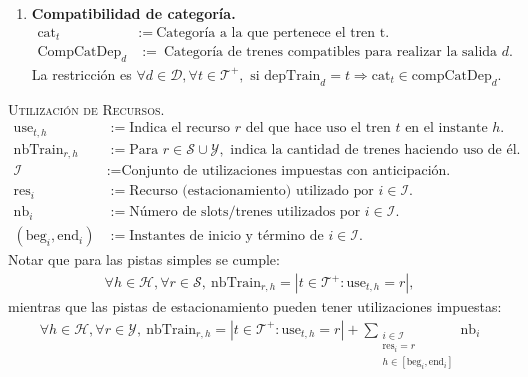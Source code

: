 \documentclass[letter, 10pt]{article}
\begin{document}
\begin{description}
\begin{enumerate}
        \item \textbf{Compatibilidad de categoría.}
        \begin{align*}
            \text{cat}_t &:= \ \text{Categoría a la que pertenece el tren t.} \\
            \text{CompCatDep}_d &:= \ \text{Categoría de trenes compatibles para realizar la salida } d.
        \end{align*}
        La restricción es $\displaystyle \forall d \in \mathcal{D}, \forall t \in \mathcal{T}^+, \text{ si } \text{depTrain}_d = t \Rightarrow \text{cat}_t \in \text{compCatDep}_d$.
    \end{enumerate}

    \item \textsc{Utilización de Recursos.}
    \begin{align*}
        \text{use}_{t,h} &:= \text{Indica el recurso } r \text{ del que hace uso el tren } t \text{ en el instante } h. \\
        \text{nbTrain}_{r,h} &:= \text{Para } r \in \mathcal{S}\cup \mathcal{Y}, \text{ indica la cantidad de trenes haciendo uso de él.} \\
        \mathcal{I} &:= \text{Conjunto de utilizaciones impuestas con anticipación.} \\
        \text{res}_i &:= \text{Recurso (estacionamiento) utilizado por } i \in \mathcal{I}. \\
        \text{nb}_i &:= \text{Número de slots/trenes utilizados por } i \in \mathcal{I}. \\
        (\text{beg}_i,\text{end}_i) &:= \text{Instantes de inicio y término de } i \in \mathcal{I}.
    \end{align*}
    Notar que para las pistas simples se cumple:
    \begin{align*}
        \forall h \in \mathcal{H}, \forall r \in \mathcal{S}, \ \text{nbTrain}_{r,h} = \left|{t \in \mathcal{T}^+: \text{use}_{t,h} = r} \right|,
    \end{align*}
    mientras que las pistas de estacionamiento pueden tener utilizaciones impuestas:
    \begin{align*}
        \forall h \in \mathcal{H}, \forall r \in \mathcal{Y}, \ \text{nbTrain}_{r,h} = \left|{t \in \mathcal{T}^+: \text{use}_{t,h} = r} \right| + \sum_{\substack{i \in \mathcal{I} \\ \text{res}_i = r \\ h \in [\text{beg}_i, \text{end}_i]}} \text{nb}_i
    \end{align*}


\end{description}
\end{document}
